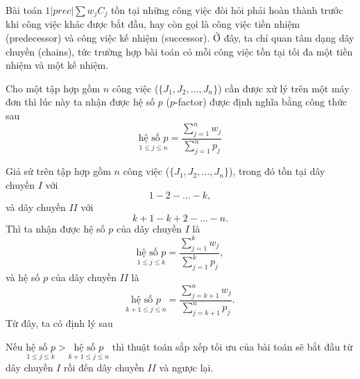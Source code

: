 Bài toán $1|prec|\sum w_j C_j$ tồn tại những công việc đòi hỏi phải hoàn thành trước khi công việc khác được bắt đầu, hay còn gọi là công việc tiền nhiệm (predecessor) và công việc kế nhiệm (successor). Ở đây, ta chỉ quan tâm dạng dây chuyền (chains), tức trường hợp bài toán có mỗi công việc tồn tại tối đa một tiền nhiệm và một kế nhiệm.

\begin{dn}
Cho một tập hợp gồm $n$ công việc ($\{J_1, J_2, …, J_n\}$) cần được xử lý trên một máy đơn thì lúc này ta nhận được hệ số $p$ ($p$-factor) được định nghĩa bằng công thức sau
\begin{equation}
	\underset{1 \leq j \leq n}{\text{hệ số }p} = \frac{\sum_{j=1}^n w_j}{\sum_{j=1}^n p_j}
\end{equation}
\end{dn}

Giả sử trên tập hợp gồm $n$ công việc ($\{J_1, J_2, …, J_n\}$), trong đó tồn tại dây chuyền $I$ với
\begin{equation*}
1 - 2 - \ldots - k,
\end{equation*}
và dây chuyền $II$ với
\begin{equation*}
k+1 - k+2 - \ldots - n.
\end{equation*}
Thì ta nhận được hệ số $p$ của dây chuyền $I$ là
\begin{equation}
	\underset{1 \leq j \leq k}{\text{hệ số }p} = \frac{\sum_{j=1}^k w_j}{\sum_{j=1}^k p_j},
\end{equation}
và hệ số $p$ của dây chuyền $II$ là
\begin{equation}
	\underset{k+1 \leq j \leq n}{\text{hệ số }p} = \frac{\sum_{j=k+1}^n w_j}{\sum_{j=k+1}^n p_j}.
\end{equation}
Từ đây, ta có định lý sau
\begin{dl} \label{daychuyen}
	Nếu $\underset{1 \leq j \leq k}{\text{hệ số }p} > \underset{k+1 \leq j \leq n}{\text{hệ số }p}$ thì thuật toán sắp xếp tối ưu của bài toán sẽ bắt đầu từ dây chuyền $I$ rồi đến dây chuyền $II$ và ngược lại.
\end{dl}

